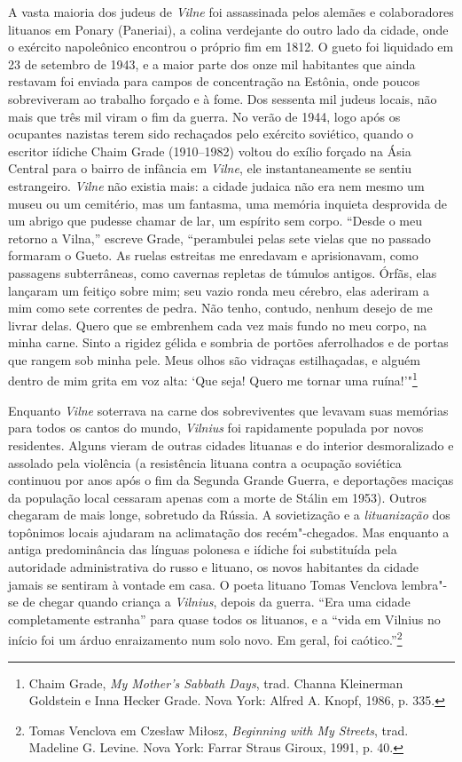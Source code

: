 A vasta maioria dos judeus de \textit{Vilne} foi assassinada pelos alemães e
colaboradores lituanos em Ponary (Paneriai), a colina verdejante do
outro lado da cidade, onde o exército napoleônico encontrou o próprio
fim em 1812. O gueto foi liquidado em 23 de setembro de 1943, e a maior
parte dos onze mil habitantes que ainda restavam foi enviada para campos
de concentração na Estônia, onde poucos sobreviveram ao trabalho forçado
e à fome. Dos sessenta mil judeus locais, não mais que três mil viram o
fim da guerra. No verão de 1944, logo após os ocupantes nazistas terem
sido rechaçados pelo exército soviético, quando o escritor iídiche Chaim
Grade (1910--1982) voltou do exílio forçado na Ásia Central para o bairro
de infância em \textit{Vilne}, ele instantaneamente se sentiu estrangeiro. \textit{Vilne}
não existia mais: a cidade judaica não era nem mesmo um museu ou um
cemitério, mas um fantasma, uma memória inquieta desprovida de um abrigo
que pudesse chamar de lar, um espírito sem corpo. ``Desde o meu retorno
a Vilna,'' escreve Grade, ``perambulei pelas sete vielas que no passado
formaram o Gueto. As ruelas estreitas me enredavam e aprisionavam, como
passagens subterrâneas, como cavernas repletas de túmulos antigos.
Órfãs, elas lançaram um feitiço sobre mim; seu vazio ronda meu cérebro,
elas aderiram a mim como sete correntes de pedra. Não tenho, contudo,
nenhum desejo de me livrar delas. Quero que se embrenhem cada vez mais
fundo no meu corpo, na minha carne. Sinto a rigidez gélida e sombria de
portões aferrolhados e de portas que rangem sob minha pele. Meus olhos
são vidraças estilhaçadas, e alguém dentro de mim grita em voz alta:
`Que seja! Quero me tornar uma ruína!'"\footnote{Chaim Grade, \textit{My Mother's Sabbath Days}, trad. Channa Kleinerman Goldstein e Inna Hecker Grade. Nova York: Alfred A. Knopf, 1986, p. 335.}

Enquanto \textit{Vilne} soterrava na carne dos sobreviventes que levavam suas
memórias para todos os cantos do mundo, \textit{Vilnius} foi rapidamente populada
por novos residentes. Alguns vieram de outras cidades lituanas e do
interior desmoralizado e assolado pela violência (a resistência lituana
contra a ocupação soviética continuou por anos após o fim da Segunda
Grande Guerra, e deportações maciças da população local cessaram apenas
com a morte de Stálin em 1953). Outros chegaram de mais longe, sobretudo
da Rússia. A sovietização e a \textit{lituanização} dos topônimos locais ajudaram
na aclimatação dos recém"-chegados. Mas enquanto a antiga predominância
das línguas polonesa e iídiche foi substituída pela autoridade
administrativa do russo e lituano, os novos habitantes da cidade jamais
se sentiram à vontade em casa. O poeta lituano Tomas Venclova lembra"-se
de chegar quando criança a \textit{Vilnius}, depois da guerra. ``Era uma cidade
completamente estranha'' para quase todos os lituanos, e a ``vida em
Vilnius no início foi um árduo enraizamento num solo novo. Em geral, foi
caótico.''\footnote{Tomas Venclova em Czesław Miłosz, \textit{Beginning with My Streets}, trad. Madeline G. Levine. Nova York: Farrar Straus Giroux, 1991, p. 40.}

